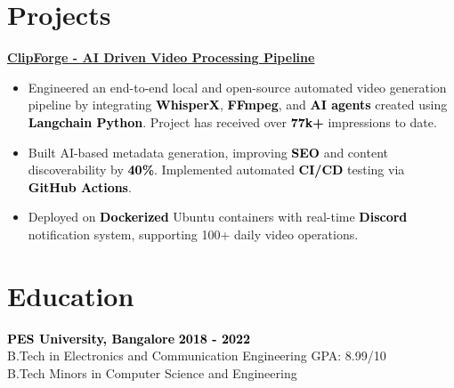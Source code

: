 \documentclass[a4paper,10pt]{article}
\newcommand{\bb}[1]{\textcolor{black}{\textbf{#1}}}
\begin{document}
\section{Projects}
\bb{\href{https://github.com/rajathjn/shorts_maker}{ClipForge - AI Driven Video Processing Pipeline}}
\smallskip
\begin{itemize}[nosep, leftmargin=2em, itemsep=3pt]
    \item Engineered an end-to-end local and open-source automated video generation pipeline by integrating \bb{WhisperX}, \bb{FFmpeg}, and \bb{AI agents} created using \bb{Langchain Python}. Project has received over \bb{77k+} impressions to date.
    \item Built AI-based metadata generation, improving \bb{SEO} and content discoverability by \bb{40\%}. Implemented automated \bb{CI/CD} testing via \bb{GitHub Actions}.
    \item Deployed on \bb{Dockerized} Ubuntu containers with real-time \bb{Discord} notification system, supporting 100+ daily video operations.
\end{itemize}
\vspace{-1em}
%
%
\section{Education}
\bb{PES University, Bangalore} \hfill \bb{2018 - 2022} \\
B.Tech in Electronics and Communication Engineering \hfill GPA: 8.99/10 \\
B.Tech Minors in Computer Science and Engineering
%
%
\end{document}
